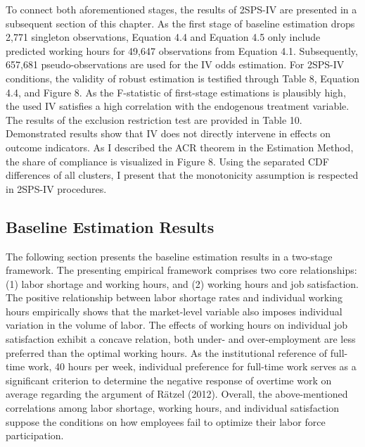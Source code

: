 \documentclass[
  12pt,
]{article}
\begin{document}
To connect both aforementioned stages, the results of 2SPS-IV are
presented in a subsequent section of this chapter. As the first stage of
baseline estimation drops 2,771 singleton observations, Equation 4.4 and
Equation 4.5 only include predicted working hours for 49,647
observations from Equation 4.1. Subsequently, 657,681
pseudo-observations are used for the IV odds estimation. For 2SPS-IV
conditions, the validity of robust estimation is testified through Table
8, Equation 4.4, and Figure 8. As the F-statistic of first-stage
estimations is plausibly high, the used IV satisfies a high correlation
with the endogenous treatment variable. The results of the exclusion
restriction test are provided in Table 10. Demonstrated results show
that IV does not directly intervene in effects on outcome indicators. As
I described the ACR theorem in the Estimation Method, the share of
compliance is visualized in Figure 8. Using the separated CDF
differences of all clusters, I present that the monotonicity assumption
is respected in 2SPS-IV procedures.

\subsection{Baseline Estimation
Results}\label{baseline-estimation-results}

The following section presents the baseline estimation results in a
two-stage framework. The presenting empirical framework comprises two
core relationships: (1) labor shortage and working hours, and (2)
working hours and job satisfaction. The positive relationship between
labor shortage rates and individual working hours empirically shows that
the market-level variable also imposes individual variation in the
volume of labor. The effects of working hours on individual job
satisfaction exhibit a concave relation, both under- and over-employment
are less preferred than the optimal working hours. As the institutional
reference of full-time work, 40 hours per week, individual preference
for full-time work serves as a significant criterion to determine the
negative response of overtime work on average regarding the argument of
Rätzel (2012). Overall, the above-mentioned correlations among labor
shortage, working hours, and individual satisfaction suppose the
conditions on how employees fail to optimize their labor force
participation.
\end{document}
